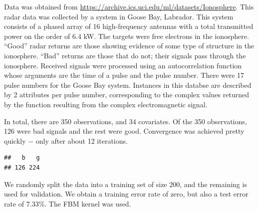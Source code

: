 \documentclass[class=article, crop=false]{standalone}\usepackage[]{graphicx}\usepackage[]{color}
\makeatletter
\newenvironment{kframe}{%
 \def\at@end@of@kframe{}%
 \ifinner\ifhmode%
  \def\at@end@of@kframe{\end{minipage}}%
  \begin{minipage}{\columnwidth}%
 \fi\fi%
 \def\FrameCommand##1{\hskip\@totalleftmargin \hskip-\fboxsep
 \colorbox{shadecolor}{##1}\hskip-\fboxsep
     \hskip-\linewidth \hskip-\@totalleftmargin \hskip\columnwidth}%
 \MakeFramed {\advance\hsize-\width
   \@totalleftmargin\z@ \linewidth\hsize
   \@setminipage}}%
 {\par\unskip\endMakeFramed%
 \at@end@of@kframe}
\newenvironment{knitrout}{}{} %
\makeatother
\begin{document}
Data was obtained from \url{https://archive.ics.uci.edu/ml/datasets/Ionosphere}. This radar data was collected by a system in Goose Bay, Labrador. This system consists of a phased array of 16 high-frequency antennas with a total transmitted power on the order of 6.4 kW. The targets were free electrons in the ionosphere. ``Good'' radar returns are those showing evidence of some type of structure in the ionosphere. ``Bad'' returns are those that do not; their signals pass through the ionosphere. Received signals were processed using an autocorrelation function whose arguments are the time of a pulse and the pulse number. There were 17 pulse numbers for the Goose Bay system. Instances in this databse are described by 2 attributes per pulse number, corresponding to the complex values returned by the function resulting from the complex electromagnetic signal.

In total, there are 350 observations, and 34 covariates. Of the 350 observations, 126 were bad signals and the rest were good. Convergence was achieved pretty quickly $-$ only after about 12 iterations.

\begin{knitrout}
\color{fgcolor}\begin{kframe}
\begin{verbatim}
##   b   g 
## 126 224
\end{verbatim}
\end{kframe}
\end{knitrout}

We randomly split the data into a training set of size 200, and the remaining is used for validation. We obtain a training error rate of zero, but also a test error rate of 7.33\%. The FBM kernel was used.
\end{document}

